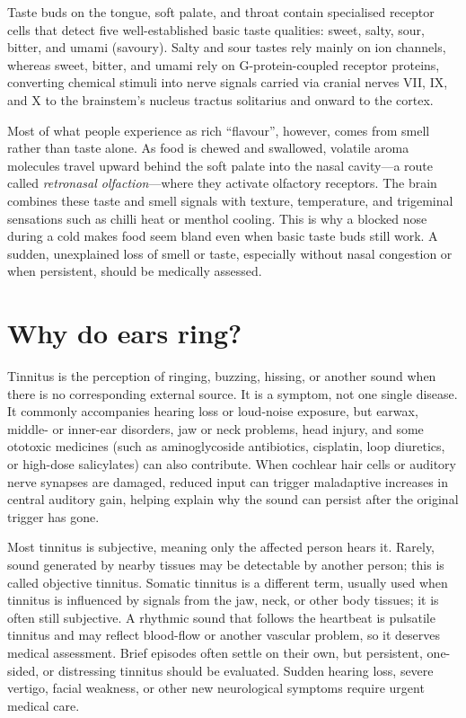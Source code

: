 \documentclass[11pt,oneside]{report}
\begin{document}
Taste buds on the tongue, soft palate, and throat contain specialised receptor
cells that detect five well-established basic taste qualities: sweet, salty,
sour, bitter, and umami (savoury). Salty and sour tastes rely mainly on ion
channels, whereas sweet, bitter, and umami rely on G-protein-coupled receptor
proteins, converting chemical stimuli into nerve signals carried via cranial
nerves VII, IX, and X to the brainstem's nucleus tractus solitarius and onward
to the cortex.

Most of what people experience as rich ``flavour'', however, comes from smell
rather than taste alone. As food is chewed and swallowed, volatile aroma
molecules travel upward behind the soft palate into the nasal cavity---a route
called \emph{retronasal olfaction}---where they activate olfactory receptors.
The brain combines these taste and smell signals with texture, temperature, and
trigeminal sensations such as chilli heat or menthol cooling. This is why a
blocked nose during a cold makes food seem bland even when basic taste buds
still work. A sudden, unexplained loss of smell or taste, especially without
nasal congestion or when persistent, should be medically assessed.

\section{Why do ears ring?}

Tinnitus is the perception of ringing, buzzing, hissing, or another sound when
there is no corresponding external source. It is a symptom, not one single
disease. It commonly accompanies hearing loss or loud-noise exposure, but
earwax, middle- or inner-ear disorders, jaw or neck problems, head injury, and
some ototoxic medicines (such as aminoglycoside antibiotics, cisplatin, loop
diuretics, or high-dose salicylates) can also contribute. When cochlear hair
cells or auditory nerve synapses are damaged, reduced input can trigger
maladaptive increases in central auditory gain, helping explain why the sound
can persist after the original trigger has gone.

Most tinnitus is subjective, meaning only the affected person hears it. Rarely,
sound generated by nearby tissues may be detectable by another person; this is
called objective tinnitus. Somatic tinnitus is a different term, usually used
when tinnitus is influenced by signals from the jaw, neck, or other body tissues;
it is often still subjective. A rhythmic sound that follows the heartbeat is
pulsatile tinnitus and may reflect blood-flow or another vascular problem, so it
deserves medical assessment. Brief episodes often settle on their own, but
persistent, one-sided, or distressing tinnitus should be evaluated. Sudden
hearing loss, severe vertigo, facial weakness, or other new neurological symptoms
require urgent medical care.
\end{document}
